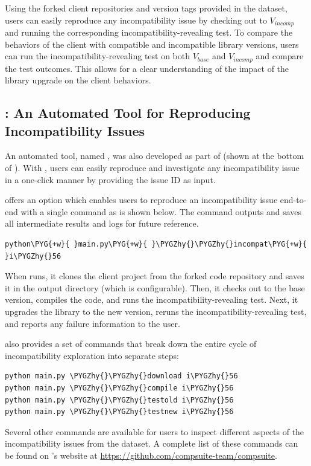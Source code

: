 Using the forked client repositories and version tags provided in the
\toolcompsuite dataset, users can easily reproduce any incompatibility issue by
checking out to $V_{incomp}$ and running the corresponding
incompatibility-revealing test. To compare the behaviors of the client
with compatible and incompatible library versions, users can run the
incompatibility-revealing test on both $V_{base}$ and $V_{incomp}$ and
compare the test outcomes. This allows for a clear understanding of
the impact of the library upgrade on the client behaviors.


\subsection{\runner: An Automated Tool for Reproducing Incompatibility Issues}

An automated tool, named \runner, was also developed as part of \toolcompsuite (shown at the bottom of ). With \runner, users can easily reproduce and investigate any
incompatibility issue in a one-click manner by providing the issue ID
as input.

\runner offers an option which enables users to reproduce an
incompatibility issue end-to-end with a single command as is shown below.
The command outputs and saves all intermediate results and logs for future
reference.

\begin{Verbatim}[fontsize=\small,breaklines,linenos,xleftmargin=8pt,numbersep=5pt,commandchars=\\\{\}]
python\PYG{+w}{ }main.py\PYG{+w}{ }\PYGZhy{}\PYGZhy{}incompat\PYG{+w}{ }i\PYGZhy{}56
\end{Verbatim}

When \runner runs, it clones the client project from the forked
code repository and saves it in the output directory (which is configurable).
Then, it checks out to the base version, compiles the code, and runs the
incompatibility-revealing test. Next, it upgrades the library to the
new version, reruns the incompatibility-revealing test, and reports
any failure information to the user.

\runner also provides a set of commands that break down the entire cycle of incompatibility
exploration into separate steps:

\begin{Verbatim}[fontsize=\small,breaklines,linenos,xleftmargin=8pt,numbersep=5pt,commandchars=\\\{\}]
python main.py \PYGZhy{}\PYGZhy{}download i\PYGZhy{}56
python main.py \PYGZhy{}\PYGZhy{}compile i\PYGZhy{}56
python main.py \PYGZhy{}\PYGZhy{}testold i\PYGZhy{}56
python main.py \PYGZhy{}\PYGZhy{}testnew i\PYGZhy{}56
\end{Verbatim}


Several other \runner commands are available for users to inspect
different aspects of the incompatibility issues from the \toolcompsuite dataset. A
complete list of these commands can be found on \toolcompsuite's website at
\url{https://github.com/compsuite-team/compsuite}.


